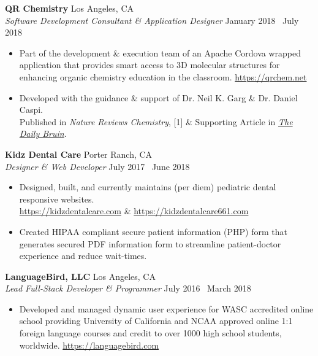 \documentclass[margin]{res}
\begin{document}
\begin{resume}
		{\bf QR Chemistry} \hfill Los Angeles, CA \\
		{\it Software Development Consultant \& Application Designer} \hfill January 2018 \textendash\ July 2018
		\begin{itemize} \itemsep -2pt
			\item Part of the development \& execution team of an Apache Cordova wrapped application that provides smart access to 3D molecular structures for enhancing organic chemistry education in the classroom. \textcolor{RoyalBlue}{\url{https://qrchem.net}}
			\item Developed with the guidance \& support of Dr. Neil K. Garg \& Dr. Daniel Caspi. \\Published in {\it Nature Reviews Chemistry}, [1] \& Supporting Article in \textcolor{RoyalBlue}{\href{https://dailybruin.com/2018/07/30/student-developed-tool-brings-3d-molecular-models-to-smartphone-screen/}{\it The Daily Bruin}}.
		\end{itemize}
		
		{\bf Kidz Dental Care} \hfill Porter Ranch, CA \\
		{\it Designer \& Web Developer} \hfill July 2017 \textendash\ June 2018
		\begin{itemize} \itemsep -2pt
			\item Designed, built, and currently maintains (per diem) pediatric dental responsive websites. \\ \textcolor{RoyalBlue}{\url{https://kidzdentalcare.com}} \& \textcolor{RoyalBlue}{\url{https://kidzdentalcare661.com}}
			\item Created HIPAA compliant secure patient information (PHP) form that generates secured PDF information form to streamline patient-doctor experience and reduce wait-times.
		\end{itemize}
		\vspace{0.02cm} 
		{\bf LanguageBird\textsuperscript{\textregistered}, LLC} \hfill Los Angeles, CA \\
		{\it Lead Full-Stack Developer \& Programmer} \hfill July 2016 \textendash\ March 2018
		\begin{itemize} \itemsep -2pt
			\item Developed and managed dynamic user experience for WASC accredited online school providing University of California and NCAA approved online 1:1 foreign language courses and credit to over 1000 high school students, worldwide. \textcolor{RoyalBlue}{\url{https://languagebird.com}}
		\end{itemize}
		

\end{resume}
\end{document}
